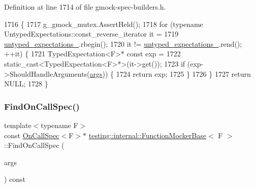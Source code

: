 Definition at line 1714 of file gmock-\/spec-\/builders.\+h.


\begin{DoxyCode}
1716                                                         \{
1717     g\_gmock\_mutex.AssertHeld();
1718     \textcolor{keywordflow}{for} (\textcolor{keyword}{typename} UntypedExpectations::const\_reverse\_iterator it =
1719              \hyperlink{classtesting_1_1internal_1_1UntypedFunctionMockerBase_aae4a42a4bace1fcb0cd4bdf1ddd40277}{untyped\_expectations\_}.rbegin();
1720          it != \hyperlink{classtesting_1_1internal_1_1UntypedFunctionMockerBase_aae4a42a4bace1fcb0cd4bdf1ddd40277}{untyped\_expectations\_}.rend(); ++it) \{
1721       TypedExpectation<F>* \textcolor{keyword}{const} exp =
1722           \textcolor{keyword}{static\_cast<}TypedExpectation<F>*\textcolor{keyword}{>}(it->get());
1723       \textcolor{keywordflow}{if} (exp->ShouldHandleArguments(\hyperlink{namespacegenerate__debs_a75f9143e38df82d83b2e8a6f99cae02c}{args})) \{
1724         \textcolor{keywordflow}{return} exp;
1725       \}
1726     \}
1727     \textcolor{keywordflow}{return} NULL;
1728   \}
\end{DoxyCode}
\mbox{\label{classtesting_1_1internal_1_1FunctionMockerBase_a3bcd2e8191ffc44bd59b8d8d25eefd3e}} 
\subsubsection{\texorpdfstring{Find\+On\+Call\+Spec()}{FindOnCallSpec()}}
{\footnotesize\ttfamily template$<$typename F$>$ \\
const \hyperlink{classtesting_1_1internal_1_1OnCallSpec}{On\+Call\+Spec}$<$F$>$$\ast$ \hyperlink{classtesting_1_1internal_1_1FunctionMockerBase}{testing\+::internal\+::\+Function\+Mocker\+Base}$<$ F $>$\+::Find\+On\+Call\+Spec (\begin{DoxyParamCaption}\item[{const \hyperlink{classtesting_1_1internal_1_1FunctionMockerBase_a336432a07e544af4ffb8103603471ca3}{Argument\+Tuple} \&}]{args }\end{DoxyParamCaption}) const\hspace{0.3cm}{\ttfamily [inline]}}



